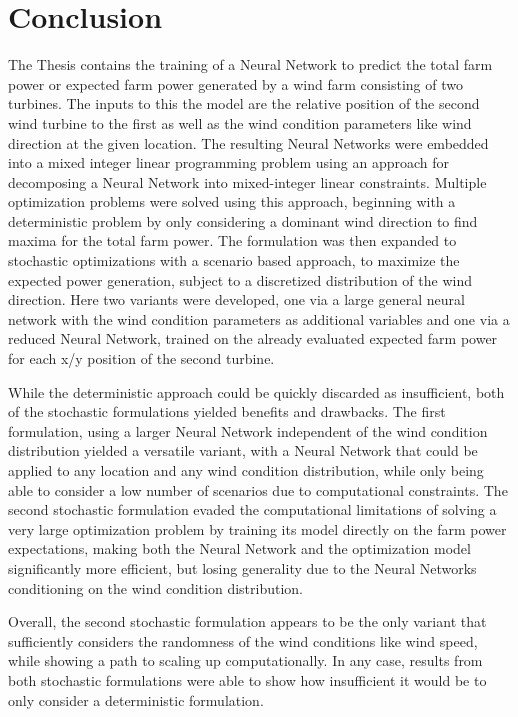 
\chapter{Conclusion}\label{chapter:conclusion}

The Thesis contains the training of a Neural Network to predict the total farm power or expected farm power generated by a wind farm consisting of two turbines. The inputs to this the model are the relative position of the second wind turbine to the first as well as the wind condition parameters like wind direction at the given location. The resulting Neural Networks were embedded into a mixed integer linear programming problem using an approach for decomposing a Neural Network into mixed-integer linear constraints. Multiple optimization problems were solved using this approach, beginning with a deterministic problem by only considering a dominant wind direction to find maxima for the total farm power. The formulation was then expanded to stochastic optimizations with a scenario based approach, to maximize the expected power generation, subject to a discretized distribution of the wind direction. Here two variants were developed, one via a large general neural network with the wind condition parameters as additional variables and one via a reduced Neural Network, trained on the already evaluated expected farm power for each x/y position of the second turbine. 

While the deterministic approach could be quickly discarded as insufficient, both of the stochastic formulations yielded benefits and drawbacks. The first formulation, using a larger Neural Network independent of the wind condition distribution yielded a versatile variant, with a Neural Network that could be applied to any location and any wind condition distribution, while only being able to consider a low number of scenarios due to computational constraints. The second stochastic formulation evaded the computational limitations of solving a very large optimization problem by training its model directly on the farm power expectations, making both the Neural Network and the optimization model significantly more efficient, but losing generality due to the Neural Networks conditioning on the wind condition distribution.

Overall, the second stochastic formulation appears to be the only variant that sufficiently considers the randomness of the wind conditions like wind speed, while showing a path to scaling up computationally. In any case, results from both stochastic formulations were able to show how insufficient it would be to only consider a deterministic formulation.


